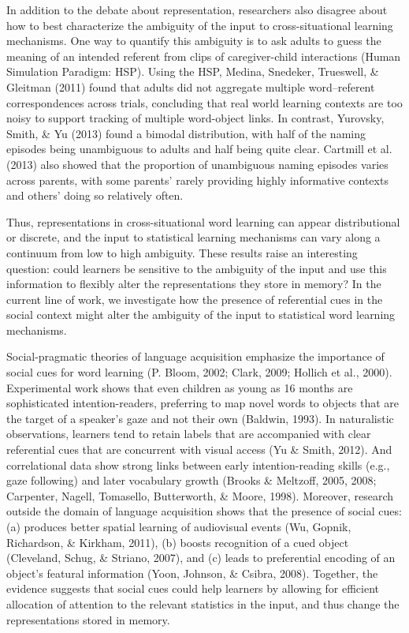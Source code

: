 \documentclass[authoryear, review]{elsarticle}
\begin{document}
In addition to the debate about representation, researchers also
disagree about how to best characterize the ambiguity of the input to
cross-situational learning mechanisms. One way to quantify this
ambiguity is to ask adults to guess the meaning of an intended referent
from clips of caregiver-child interactions (Human Simulation Paradigm:
HSP). Using the HSP, Medina, Snedeker, Trueswell, \& Gleitman (2011)
found that adults did not aggregate multiple word--referent
correspondences across trials, concluding that real world learning
contexts are too noisy to support tracking of multiple word-object
links. In contrast, Yurovsky, Smith, \& Yu (2013) found a bimodal
distribution, with half of the naming episodes being unambiguous to
adults and half being quite clear. Cartmill et al. (2013) also showed
that the proportion of unambiguous naming episodes varies across
parents, with some parents' rarely providing highly informative contexts
and others' doing so relatively often.

Thus, representations in cross-situational word learning can appear
distributional or discrete, and the input to statistical learning
mechanisms can vary along a continuum from low to high ambiguity. These
results raise an interesting question: could learners be sensitive to
the ambiguity of the input and use this information to flexibly alter
the representations they store in memory? In the current line of work,
we investigate how the presence of referential cues in the social
context might alter the ambiguity of the input to statistical word
learning mechanisms.

Social-pragmatic theories of language acquisition emphasize the
importance of social cues for word learning (P. Bloom, 2002; Clark,
2009; Hollich et al., 2000). Experimental work shows that even children
as young as 16 months are sophisticated intention-readers, preferring to
map novel words to objects that are the target of a speaker's gaze and
not their own (Baldwin, 1993). In naturalistic observations, learners
tend to retain labels that are accompanied with clear referential cues
that are concurrent with visual access (Yu \& Smith, 2012). And
correlational data show strong links between early intention-reading
skills (e.g., gaze following) and later vocabulary growth (Brooks \&
Meltzoff, 2005, 2008; Carpenter, Nagell, Tomasello, Butterworth, \&
Moore, 1998). Moreover, research outside the domain of language
acquisition shows that the presence of social cues: (a) produces better
spatial learning of audiovisual events (Wu, Gopnik, Richardson, \&
Kirkham, 2011), (b) boosts recognition of a cued object (Cleveland,
Schug, \& Striano, 2007), and (c) leads to preferential encoding of an
object's featural information (Yoon, Johnson, \& Csibra, 2008).
Together, the evidence suggests that social cues could help learners by
allowing for efficient allocation of attention to the relevant
statistics in the input, and thus change the representations stored in
memory.
\end{document}
